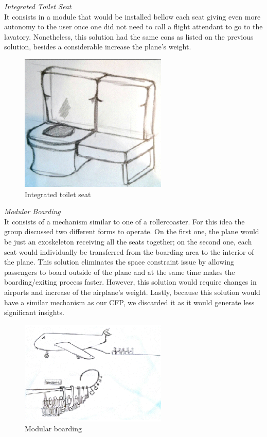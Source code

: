 \noindent\emph{Integrated Toilet Seat}\\
 It consists in a module that would be installed bellow each seat giving even more autonomy to the user once one did not need to call a flight attendant to go to 
the lavatory. Nonetheless, this solution had the same cons as listed on the previous solution, besides a considerable increase the plane's weight.\\

\begin{figure}[h]
\centering
\includegraphics[width=7cm]{brazil_images/image006.png}
\caption{Integrated toilet seat}
\label{fig:integrated_toilet}
\end{figure}


\noindent\emph{Modular Boarding}\\
 It consists of a mechanism similar to one of a rollercoaster. For this idea the group discussed two different forms to operate. On the first one, the plane would be just an exoskeleton receiving all the seats together; on the second one, each seat would individually be transferred from the boarding area to the interior of the plane. This solution eliminates the space constraint issue by allowing passengers to board outside of the plane and at the same time makes the boarding/exiting process faster. However, this solution would require changes in airports and increase of the airplane’s weight. Lastly, because this solution would have a similar mechanism as our CFP, we discarded it as it would generate less significant insights.\\

\begin{figure}[h]
\centering
\includegraphics[width=7cm]{brazil_images/image007.png}
\caption{Modular boarding}
\label{fig:modular_boarding}
\end{figure}


